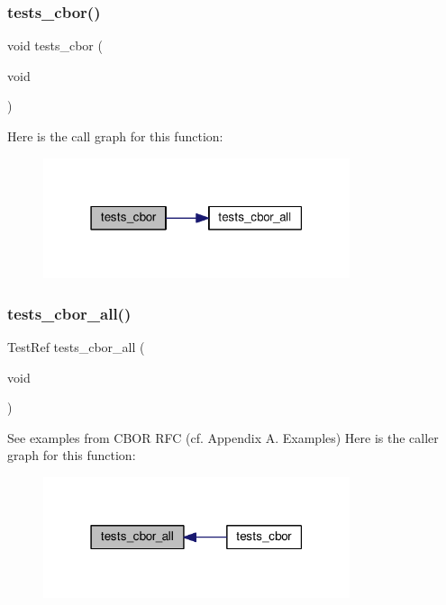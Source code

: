 \subsubsection{\texorpdfstring{tests\+\_\+cbor()}{tests\_cbor()}}
{\footnotesize\ttfamily void tests\+\_\+cbor (\begin{DoxyParamCaption}\item[{void}]{ }\end{DoxyParamCaption})}

Here is the call graph for this function\+:
\nopagebreak
\begin{figure}[H]
\begin{center}
\leavevmode
\includegraphics[width=255pt]{tests-cbor_8c_a24c307f8691c7f8d3bb6e03cf3925134_cgraph}
\end{center}
\end{figure}
\mbox{\label{tests-cbor_8c_a24bf196efee7f18a547beae07f47b7f4}} 
\subsubsection{\texorpdfstring{tests\+\_\+cbor\+\_\+all()}{tests\_cbor\_all()}}
{\footnotesize\ttfamily Test\+Ref tests\+\_\+cbor\+\_\+all (\begin{DoxyParamCaption}\item[{void}]{ }\end{DoxyParamCaption})}

See examples from C\+B\+OR R\+FC (cf. Appendix A. Examples) Here is the caller graph for this function\+:
\nopagebreak
\begin{figure}[H]
\begin{center}
\leavevmode
\includegraphics[width=255pt]{tests-cbor_8c_a24bf196efee7f18a547beae07f47b7f4_icgraph}
\end{center}
\end{figure}
